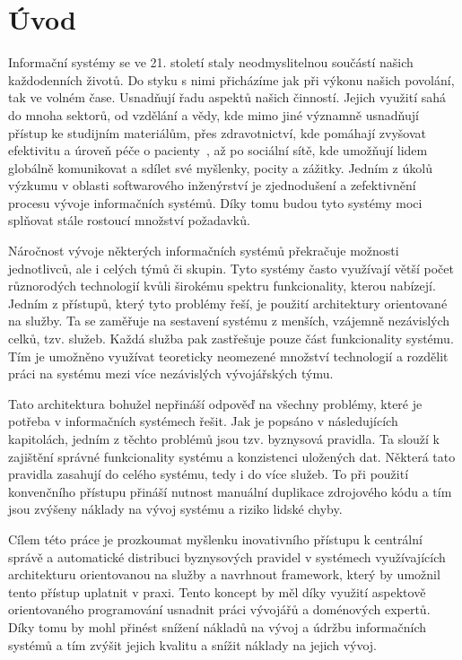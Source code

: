 
\chapter{Úvod}\label{ch:uvod}

Informační systémy se ve 21. století staly neodmyslitelnou součástí našich každodenních životů.
Do styku s nimi přicházíme jak při výkonu našich povolání, tak ve volném čase. Usnadňují
řadu aspektů našich činností. Jejich využití sahá do mnoha sektorů, od vzdělání a vědy,
kde mimo jiné významně usnadňují přístup ke studijním materiálům, přes zdravotnictví,
kde pomáhají zvyšovat efektivitu a úroveň péče o pacienty~\cite{fichman2011editorial}, až po
sociální sítě, kde umožňují lidem globálně komunikovat a sdílet své myšlenky, pocity a zážitky.
Jedním z úkolů výzkumu v oblasti softwarového inženýrství je zjednodušení a zefektivnění procesu
vývoje informačních systémů. Díky tomu budou tyto systémy moci splňovat stále rostoucí množství požadavků.

Náročnost vývoje některých informačních systémů překračuje možnosti jednotlivců, ale
i celých týmů či skupin. Tyto systémy často využívají větší počet různorodých technologií kvůli
širokému spektru funkcionality, kterou nabízejí. Jedním z přístupů, který tyto problémy řeší,
je použití architektury orientované na služby. Ta se zaměřuje na sestavení systému z menších, vzájemně
nezávislých celků, tzv. služeb. Každá služba pak zastřešuje pouze část funkcionality systému.
Tím je umožněno využívat teoreticky neomezené množství technologií a rozdělit práci na systému mezi více nezávislých
vývojářských týmu.

Tato architektura bohužel nepřináší odpověď na všechny problémy, které je potřeba v informačních
systémech řešit. Jak je popsáno v následujících kapitolách, jedním z těchto problémů jsou tzv. byznysová
pravidla. Ta slouží k zajištění správné funkcionality systému a konzistenci uložených dat.
Některá tato pravidla zasahují do celého systému, tedy i do více služeb.
To při použití konvenčního přístupu přináší nutnost manuální duplikace zdrojového
kódu a tím jsou zvýšeny náklady na vývoj systému a riziko lidské chyby.

Cílem této práce je prozkoumat myšlenku inovativního přístupu k centrální správě a automatické
distribuci byznysových pravidel v systémech využívajících architekturu orientovanou na služby
a navrhnout framework, který by umožnil tento přístup uplatnit v praxi.
Tento koncept by měl díky využití aspektově orientovaného programování usnadnit práci vývojářů
a doménových expertů. Díky tomu by mohl přinést snížení nákladů na vývoj a údržbu informačních systémů
a tím zvýšit jejich kvalitu a snížit náklady na jejich vývoj.

